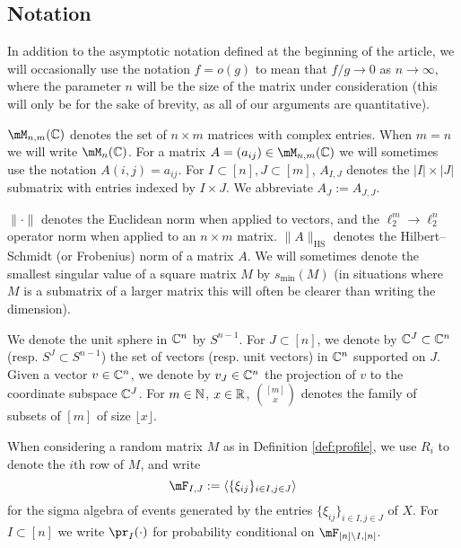 \documentclass[aop,preprint]{imsart}
\theoremstyle{plain}
\theoremstyle{definition}
\theoremstyle{remark}
\numberwithin{equation}{section}
\numberwithin{theorem}{section}
\def \lf {\lfloor}
\def \rf {\rfloor}
\def \HS {\mathrm{HS}}
\begin{document}
\subsection{Notation}		\label{sec:notation}

In addition to the asymptotic notation defined at the beginning of the article,
we will occasionally use the notation $f=o(g)$ to mean that $f/g\rightarrow 0$ as $n\rightarrow \infty$, where the parameter $n$ will be the size of the matrix under consideration (this will only be for the sake of brevity, as all of our arguments are quantitative).

$\mM_{n,m}(\C)$ denotes the set of $n\times m$ matrices with complex entries. When $m=n$ we will write $\mM_n(\C)$.
For a matrix $A=(a_{ij})\in \mM_{n,m}(\C)$ we will sometimes use the notation $A(i,j)= a_{ij}$.
For $I\subset[n],J\subset[m]$, $A_{I,J}$ denotes the $|I|\times |J|$ submatrix with entries indexed by $I\times J$.
We abbreviate $A_{J}:= A_{J,J}$.

$\|\cdot\|$ denotes the Euclidean norm when applied to vectors, and the $\ell_2^m\to\ell_2^n$ operator norm when applied to an $n\times m$ matrix.
$\|A\|_{\HS}$ denotes the Hilbert--Schmidt (or Frobenius) norm of a matrix $A$. 
We will sometimes denote the smallest singular value of a square matrix $M$ by $s_{\min}(M)$ (in situations where $M$ is a submatrix of a larger matrix this will often be clearer than writing the dimension).

We denote the unit sphere in ${\mathbb C}^n$ by $S^{n-1}$. 
For $J\subset [n]$, we denote by ${\mathbb C}^J\subset{\mathbb C}^n$ (resp. $S^J\subset S^{n-1}$) the set of vectors (resp. unit vectors) in ${\mathbb C}^n$ supported on $J$.
Given a vector $v\in {\mathbb C}^n$, we denote by $v_J\in {\mathbb C}^n$ the projection of $v$ to the coordinate subspace ${\mathbb C}^J$.
For $m\in {\mathbb N}$, $x\in {\mathbb R}$, ${[m]\choose x}$ denotes the family of subsets of $[m]$ of size $\lf x\rf$.

When considering a random matrix $M$ as in Definition \ref{def:profile}, 
we use $R_i$ to denote the $i$th row of $M$, and write
%
\begin{equation}	\label{def:sigmaalgebra}
\mF_{I,J}:= \langle \{\xi_{ij}\}_{i\in I,j\in J}\rangle
\end{equation}
for the sigma algebra of events generated by the entries $\{\xi_{ij}\}_{i\in I,j\in J}$ of $X$.
For $I\subset[n]$ we write $\pr_I(\cdot)$ for probability conditional on $\mF_{[n]\setminus I,[n]}$.\\
\end{document}

